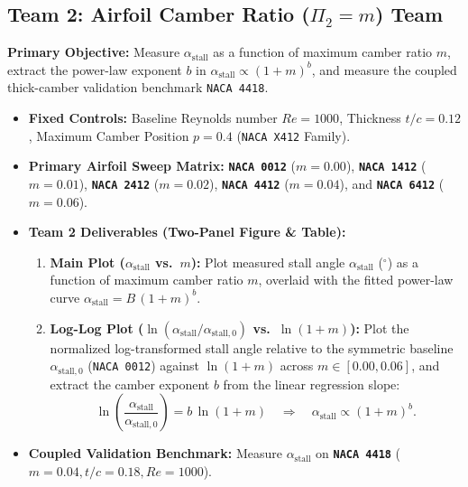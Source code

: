 \documentclass[11pt,a4paper]{article}
\begin{document}
\subsection{Team 2: Airfoil Camber Ratio (\texorpdfstring{$\Pi_2 = m$}{Pi2 = m}) Team}
\textbf{Primary Objective:} Measure $\alpha_{\text{stall}}$ as a function of maximum camber ratio $m$, extract the power-law exponent $b$ in $\alpha_{\text{stall}} \propto (1+m)^b$, and measure the coupled thick-camber validation benchmark \texttt{NACA 4418}.
\begin{itemize}[itemsep=2pt]
    \item \textbf{Fixed Controls:} Baseline Reynolds number $Re = 1000$, Thickness $t/c = 0.12$, Maximum Camber Position $p = 0.4$ (\texttt{NACA X412} Family).
    \item \textbf{Primary Airfoil Sweep Matrix:} \textbf{\texttt{NACA 0012}} ($m = 0.00$), \textbf{\texttt{NACA 1412}} ($m = 0.01$), \textbf{\texttt{NACA 2412}} ($m = 0.02$), \textbf{\texttt{NACA 4412}} ($m = 0.04$), and \textbf{\texttt{NACA 6412}} ($m = 0.06$).
    \item \textbf{Team 2 Deliverables (Two-Panel Figure \& Table):}
    \begin{enumerate}
        \item \textbf{Main Plot ($\alpha_{\text{stall}}$ vs.\ $m$):} Plot measured stall angle $\alpha_{\text{stall}}$ ($^\circ$) as a function of maximum camber ratio $m$, overlaid with the fitted power-law curve $\alpha_{\text{stall}} = B\,(1+m)^b$.
        \item \textbf{Log-Log Plot ($\ln(\alpha_{\text{stall}}/\alpha_{\text{stall},0})$ vs.\ $\ln(1+m)$):} Plot the normalized log-transformed stall angle relative to the symmetric baseline $\alpha_{\text{stall},0}$ (\texttt{NACA 0012}) against $\ln(1+m)$ across $m \in [0.00, 0.06]$, and extract the camber exponent $b$ from the linear regression slope:
        \begin{equation}
        \ln\!\left(\frac{\alpha_{\text{stall}}}{\alpha_{\text{stall},0}}\right) = b\,\ln(1 + m) \quad \Longrightarrow \quad \alpha_{\text{stall}} \propto (1 + m)^b.
        \end{equation}
    \end{enumerate}
    \item \textbf{Coupled Validation Benchmark:} Measure $\alpha_{\text{stall}}$ on \textbf{\texttt{NACA 4418}} ($m=0.04, t/c=0.18, Re=1000$).
\end{itemize}
\end{document}
